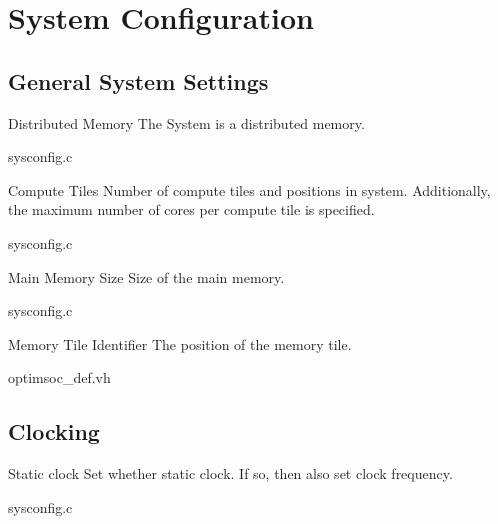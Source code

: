 \chapter{System Configuration}
\label{sec:system-configuration}

\section{General System Settings}

\begin{sysconfigbox}{Distributed Memory}
The System is a distributed memory.
\begin{sysconfigboxref}{sysconfig.c}
\end{sysconfigboxref}
\end{sysconfigbox}

\begin{sysconfigbox}{Compute Tiles}
Number of compute tiles and positions in system. Additionally, the
maximum number of cores per compute tile is specified.
\begin{sysconfigboxref}{sysconfig.c}
\end{sysconfigboxref}
\end{sysconfigbox}

\begin{sysconfigbox}{Main Memory Size}
Size of the main memory.
\begin{sysconfigboxref}{sysconfig.c}
\end{sysconfigboxref}
\end{sysconfigbox}

\begin{sysconfigbox}{Memory Tile Identifier}
The position of the memory tile.
\begin{sysconfigboxref}{optimsoc\_def.vh}
\end{sysconfigboxref}
\end{sysconfigbox}

\section{Clocking}

\begin{sysconfigbox}{Static clock}
Set whether static clock. If so, then also set clock frequency.
\begin{sysconfigboxref}{sysconfig.c}
\end{sysconfigboxref}
\end{sysconfigbox}

